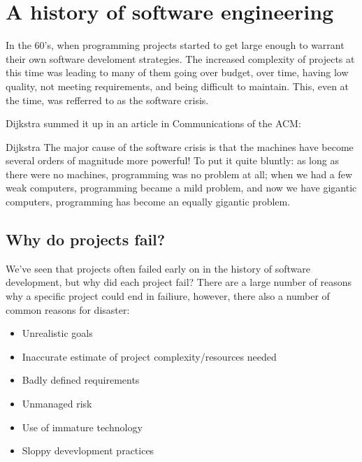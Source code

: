 
\section{A history of software engineering}

In the 60's, when programming projects started to get large enough to warrant
their own software develoment strategies. The increased complexity of projects
at this time was leading to many of them going over budget, over time, having
low quality, not meeting requirements, and being difficult to maintain. This,
even at the time, was refferred to as the software crisis.

Dijkstra summed it up in an article in Communications of the ACM:

\begin{aquote}{Dijkstra}
  The major cause of the software crisis is that the machines have become
  several orders of magnitude more powerful! To put it quite bluntly: as long
  as there were no machines, programming was no problem at all; when we had a
  few weak computers, programming became a mild problem, and now we have
  gigantic computers, programming has become an equally gigantic problem.
\end{aquote}

\subsection{Why do projects fail?}

We've seen that projects often failed early on in the history of software
development, but why did each project fail? There are a large number of
reasons why a specific project could end in failiure, however, there also a
number of common reasons for disaster:

\begin{itemize}
  \item Unrealistic goals
  \item Inaccurate estimate of project complexity/resources needed
  \item Badly defined requirements
  \item Unmanaged risk
  \item Use of immature technology
  \item Sloppy devevlopment practices
\end{itemize}

